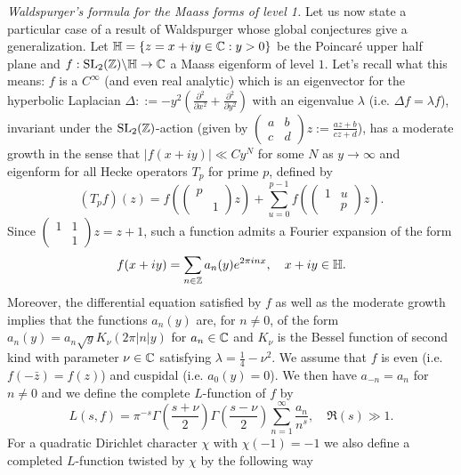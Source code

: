 \emph{Waldspurger's formula for the Maass forms of level 1.}
Let us now state a particular case of a result of Waldspurger \cite{waldspurger1985valeurs} whose global conjectures give a generalization.
Let $\mathbb{H} = \{z = x + iy \in \mathbb{C}: y > 0\}$ be the Poincaré upper half plane and $f: \mathrm{SL}_2(\mathbb{Z}) \backslash \mathbb{H} \to \mathbb{C}$ a Maass eigenform of level $1$.
Let's recall what this means: $f$ is a $C^\infty$ (and even real analytic) which is an eigenvector for the hyperbolic Laplacian $\Delta: := -y^2 \left(\frac{\partial^2}{\partial x^2} + \frac{\partial^2}{\partial y^2}\right)$ with an eigenvalue $\lambda$ (i.e. $\Delta f = \lambda f$), invariant under the $\mathrm{SL}_2(\mathbb{Z})$-action (given by $\left(\begin{smallmatrix} a & b \\ c & d \end{smallmatrix}\right) z := \frac{az + b}{cz + d}$), has a moderate growth in the sense that $|f(x + iy)| \ll Cy^N$ for some $N$ as $y \to \infty$ and eigenform for all Hecke operators $T_p$ for prime $p$, defined by
\[
    (T_p f)(z) = f\left(\left(\begin{smallmatrix}
        p&\\&1
    \end{smallmatrix}\right)z\right) + \sum_{u=0}^{p-1} f\left(\left(\begin{smallmatrix}
        1&u\\&p
    \end{smallmatrix}\right)z\right).
\]
Since $\left(\begin{smallmatrix}
    1&1\\&1
\end{smallmatrix}\right)z = z + 1$, such a function admits a Fourier expansion of the form
\[
    f(x + iy) = \sum_{n \in \mathbb{Z}} a_n(y) e^{2\pi i n x}, \quad x + iy \in \mathbb{H}.
\]
Moreover, the differential equation satisfied by $f$ as well as the moderate growth implies that the functions $a_n(y)$ are, for $n \neq 0$, of the form $a_n(y) = a_n \sqrt{y} K_\nu(2 \pi |n| y)$ for $a_n \in \mathbb{C}$ and $K_\nu$ is the Bessel function of second kind with parameter $\nu \in \mathbb{C}$ satisfying $\lambda = \frac{1}{4} - \nu^2$.
We assume that $f$ is even (i.e. $f(-\bar{z}) = f(z)$) and cuspidal (i.e. $a_0(y) = 0$).
We then have $a_{-n} = a_n$ for $n\neq 0$ and we define the complete $L$-function of $f$ by
\[
    L(s, f) = \pi^{-s} \Gamma\left(\frac{s + \nu}{2}\right) \Gamma\left(\frac{s - \nu}{2}\right) \sum_{n=1}^{\infty} \frac{a_n}{n^s}, \quad \Re(s) \gg 1.
\]
For a quadratic Dirichlet character $\chi$ with $\chi(-1) = -1$ we also define a completed $L$-function twisted by $\chi$ by the following way
